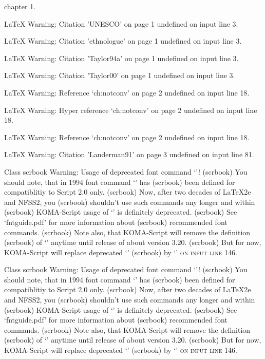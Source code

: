 chapter 1.

LaTeX Warning: Citation 'UNESCO' on page 1 undefined on input line 3.


LaTeX Warning: Citation 'ethnologue' on page 1 undefined on input line 3.


LaTeX Warning: Citation 'Taylor94a' on page 1 undefined on input line 3.


LaTeX Warning: Citation 'Taylor00' on page 1 undefined on input line 3.


LaTeX Warning: Reference `ch:notconv' on page 2 undefined on input line 18.


LaTeX Warning: Hyper reference `ch:notconv' on page 2 undefined on input line 18.


LaTeX Warning: Reference `ch:notconv' on page 2 undefined on input line 18.


LaTeX Warning: Citation 'Landerman91' on page 3 undefined on input line 81.


Class scrbook Warning: Usage of deprecated font command `\sc'!
(scrbook)              You should note, that in 1994 font command `\sc' has
(scrbook)              been defined for compatiblitiy to Script 2.0 only.
(scrbook)              Now, after two decades of LaTeX2e and NFSS2, you
(scrbook)              shouldn't use such commands any longer and within
(scrbook)              KOMA-Script usage of `\sc' is definitely deprecated.
(scrbook)              See `fntguide.pdf' for more information about
(scrbook)              recommended font commands.
(scrbook)              Note also, that KOMA-Script will remove the definition
(scrbook)              of `\sc' anytime until release of about version 3.20.
(scrbook)              But for now, KOMA-Script will replace deprecated `\sc'
(scrbook)              by `\normalfont \scshape ' on input line 146.


Class scrbook Warning: Usage of deprecated font command `\sc'!
(scrbook)              You should note, that in 1994 font command `\sc' has
(scrbook)              been defined for compatiblitiy to Script 2.0 only.
(scrbook)              Now, after two decades of LaTeX2e and NFSS2, you
(scrbook)              shouldn't use such commands any longer and within
(scrbook)              KOMA-Script usage of `\sc' is definitely deprecated.
(scrbook)              See `fntguide.pdf' for more information about
(scrbook)              recommended font commands.
(scrbook)              Note also, that KOMA-Script will remove the definition
(scrbook)              of `\sc' anytime until release of about version 3.20.
(scrbook)              But for now, KOMA-Script will replace deprecated `\sc'
(scrbook)              by `\normalfont \scshape ' on input line 146.


